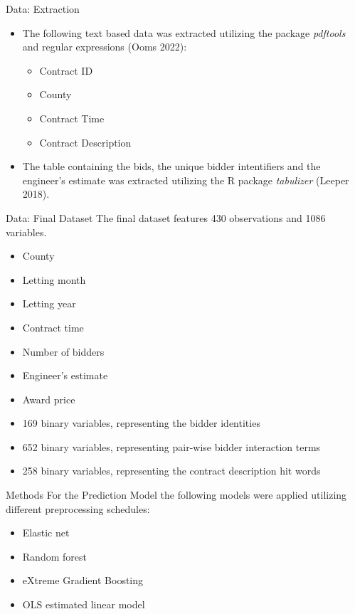 \documentclass[
  11pt,
  ignorenonframetext,
]{beamer}
\providecommand{\tightlist}{%
  \setlength{\itemsep}{0pt}\setlength{\parskip}{0pt}}
\begin{document}
\begin{frame}{Data: Extraction}
\protect\hypertarget{data-extraction}{}
\begin{itemize}
\tightlist
\item
  The following text based data was extracted utilizing the package
  \emph{pdftools} and regular expressions (Ooms 2022):

  \begin{itemize}
  \tightlist
  \item
    Contract ID
  \item
    County
  \item
    Contract Time
  \item
    Contract Description
  \end{itemize}
\item
  The table containing the bids, the unique bidder intentifiers and the
  engineer's estimate was extracted utilizing the R package
  \emph{tabulizer} (Leeper 2018).
\end{itemize}
\end{frame}

\begin{frame}{Data: Final Dataset}
\protect\hypertarget{data-final-dataset}{}
The final dataset features 430 observations and 1086 variables.

\begin{itemize}
\tightlist
\item
  County
\item
  Letting month
\item
  Letting year
\item
  Contract time
\item
  Number of bidders
\item
  Engineer's estimate
\item
  Award price
\item
  169 binary variables, representing the bidder identities
\item
  652 binary variables, representing pair-wise bidder interaction terms
\item
  258 binary variables, representing the contract description hit words
\end{itemize}
\end{frame}

\begin{frame}{Methods}
\protect\hypertarget{methods}{}
For the Prediction Model the following models were applied utilizing
different preprocessing schedules:

\begin{itemize}
\tightlist
\item
  Elastic net
\item
  Random forest
\item
  eXtreme Gradient Boosting
\item
  OLS estimated linear model
\end{itemize}
\end{frame}
\end{document}
